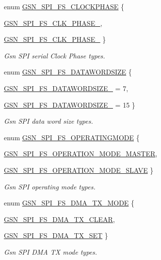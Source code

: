 \begin{DoxyCompactItemize}
enum \hyperlink{a00655_gae764e5eefaf1dedaf1561a7cd3ccb6aa}{GSN\_\-SPI\_\-FS\_\-CLOCKPHASE} \{ \par
\hyperlink{a00655_ggae764e5eefaf1dedaf1561a7cd3ccb6aaae053afe0021f0be80f2318093df597fd}{GSN\_\-SPI\_\-FS\_\-CLK\_\-PHASE\_}, 
\par
\hyperlink{a00655_ggae764e5eefaf1dedaf1561a7cd3ccb6aaa30f2e6a4ca4727ce627063d9d1d28c5a}{GSN\_\-SPI\_\-FS\_\-CLK\_\-PHASE\_}
 \}
\begin{DoxyCompactList}\small\item\em Gsn SPI serial Clock Phase types. \end{DoxyCompactList}\item 
enum \hyperlink{a00655_ga14e8640824b36f8fbc046289a0fef146}{GSN\_\-SPI\_\-FS\_\-DATAWORDSIZE} \{ \par
\hyperlink{a00655_gga14e8640824b36f8fbc046289a0fef146a2f3788be6ad47f636bdc56a18c3ae916}{GSN\_\-SPI\_\-FS\_\-DATAWORDSIZE\_} =  7, 
\par
\hyperlink{a00655_gga14e8640824b36f8fbc046289a0fef146a37642fddaf6667dfed19bacf3bd21a75}{GSN\_\-SPI\_\-FS\_\-DATAWORDSIZE\_} =  15
 \}
\begin{DoxyCompactList}\small\item\em Gsn SPI data word size types. \end{DoxyCompactList}\item 
enum \hyperlink{a00655_ga9ef97e579e4f3e5d828b8bc2c0c58d73}{GSN\_\-SPI\_\-FS\_\-OPERATINGMODE} \{ \par
\hyperlink{a00655_gga9ef97e579e4f3e5d828b8bc2c0c58d73a8384efdb14ec2cc720231e0a1c5c1c76}{GSN\_\-SPI\_\-FS\_\-OPERATION\_\-MODE\_\-MASTER}, 
\par
\hyperlink{a00655_gga9ef97e579e4f3e5d828b8bc2c0c58d73ac713886b7dd46c5b7366e2677e1d98db}{GSN\_\-SPI\_\-FS\_\-OPERATION\_\-MODE\_\-SLAVE}
 \}
\begin{DoxyCompactList}\small\item\em Gsn SPI operating mode types. \end{DoxyCompactList}\item 
enum \hyperlink{a00655_ga6654fba1f3e49677837484ec989da884}{GSN\_\-SPI\_\-FS\_\-DMA\_\-TX\_\-MODE} \{ \par
\hyperlink{a00655_gga6654fba1f3e49677837484ec989da884a9dae0ab51b4931f56156f93dca78b31f}{GSN\_\-SPI\_\-FS\_\-DMA\_\-TX\_\-CLEAR}, 
\par
\hyperlink{a00655_gga6654fba1f3e49677837484ec989da884a2201371d0d6269e540a78344bf34dd9d}{GSN\_\-SPI\_\-FS\_\-DMA\_\-TX\_\-SET}
 \}
\begin{DoxyCompactList}\small\item\em Gsn SPI DMA TX mode types. \end{DoxyCompactList}\item 

\end{DoxyCompactItemize}
